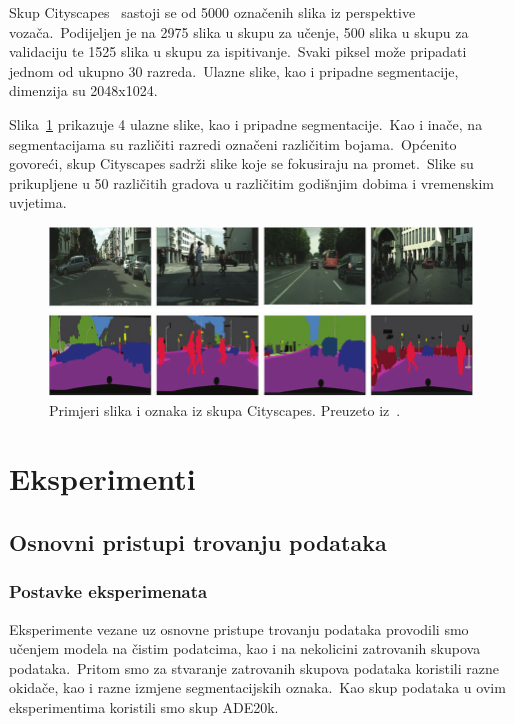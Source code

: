 \documentclass[times, utf8, seminar, numeric]{fer}
\begin{document}
Skup Cityscapes~\cite{cordts2016cityscapes} sastoji se od 5000 označenih slika iz perspektive vozača.\ 
Podijeljen je na 2975 slika u skupu za učenje, 500 slika u skupu za validaciju te 1525 slika u skupu za ispitivanje.\ Svaki piksel može pripadati jednom od ukupno 30 razreda.\ 
Ulazne slike, kao i pripadne segmentacije, dimenzija su 2048x1024.\ 
  
Slika~\ref{fig:cityscapes} prikazuje 4 ulazne slike, kao i pripadne segmentacije.\ 
Kao i inače, na segmentacijama su različiti razredi označeni različitim bojama.\ 
Općenito govoreći, skup Cityscapes sadrži slike koje se fokusiraju na promet.\ 
Slike su prikupljene u 50 različitih gradova u različitim godišnjim dobima i vremenskim uvjetima.\ 

\begin{figure}[h]
    \centering
    \includegraphics[scale=0.45]{./Slike/cityscapes.png}
    \caption{Primjeri slika i oznaka iz skupa Cityscapes. Preuzeto iz~\cite{rafique2022cnn}.}
    \label{fig:cityscapes}
\end{figure}

\chapter{Eksperimenti}

\section{Osnovni pristupi trovanju podataka}

\subsection{Postavke eksperimenata}

Eksperimente vezane uz osnovne pristupe trovanju podataka provodili smo učenjem modela na čistim podatcima, kao i na nekolicini zatrovanih skupova podataka.\ 
Pritom smo za stvaranje zatrovanih skupova podataka koristili razne okidače, kao i razne izmjene segmentacijskih oznaka.\ Kao skup podataka u ovim eksperimentima koristili smo skup ADE20k.\ 
  
\end{document}
